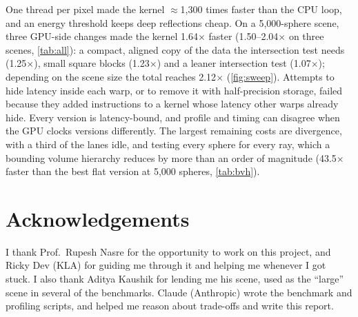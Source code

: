 \documentclass[11pt,a4paper]{article}
\begin{document}
One thread per pixel made the kernel $\approx$1,300 times faster than the CPU loop, and an energy
threshold keeps deep reflections cheap. On a 5,000-sphere scene, three GPU-side changes made the
kernel 1.64$\times$ faster (1.50--2.04$\times$ on three scenes, \cref{tab:all}): a compact, aligned
copy of the data the intersection test needs (1.25$\times$), small square blocks (1.23$\times$) and a
leaner intersection test (1.07$\times$); depending on the scene size the total reaches
2.12$\times$ (\cref{fig:sweep}). Attempts to hide latency inside each warp, or to remove it with
half-precision storage, failed because they added instructions to a kernel whose latency other warps
already hide. Every version is latency-bound,
and profile and timing can disagree when the GPU clocks versions differently. The largest remaining
costs are divergence, with a third of the lanes idle, and testing every sphere for every ray, which a
bounding volume hierarchy reduces by more than an order of magnitude (43.5$\times$ faster than the
best flat version at 5,000 spheres, \cref{tab:bvh}).

\section*{Acknowledgements}

I thank Prof.\ Rupesh Nasre for the opportunity to work on this project, and Ricky Dev (KLA) for
guiding me through it and helping me whenever I got stuck. I also thank Aditya Kaushik for lending
me his scene, used as the ``large'' scene in several of the benchmarks. Claude (Anthropic) wrote the
benchmark and profiling scripts, and helped me reason about trade-offs and write this report.
\end{document}
